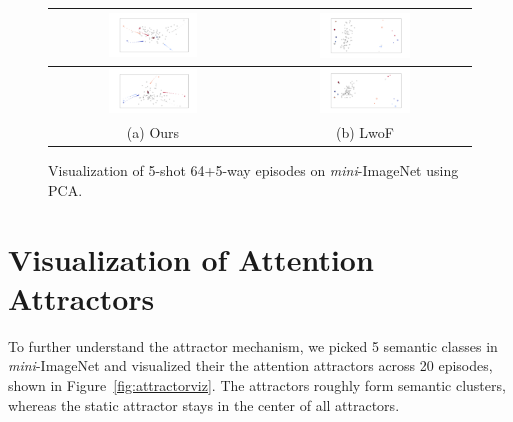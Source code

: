 \begin{figure}[h!]
\begin{minipage}[c]{\textwidth}
\begin{small}
\begin{tabular}{cc}
\hline
\includegraphics[width=0.45\textwidth,trim={2.8cm 1cm 2.5cm 1cm},clip]{figures/attractor_progress_3_noleg.pdf} & 
\includegraphics[width=0.45\textwidth,trim={2.8cm 1cm 2.5cm 1cm},clip]{figures/lwof_progress_3_noleg.pdf}\\
\hline
\includegraphics[width=0.45\textwidth,trim={2.8cm 1cm 2.5cm 1cm},clip]{figures/attractor_progress_8_noleg.pdf} & 
\includegraphics[width=0.45\textwidth,trim={2.8cm 1cm 2.5cm 1cm},clip]{figures/lwof_progress_8_noleg.pdf}\\
(a) Ours & (b) LwoF \citep{lwof}
\end{tabular}
\end{small}
\end{minipage}
\fi
\caption{Visualization of 5-shot 64+5-way episodes on \textit{mini}-ImageNet using PCA.}
\label{fig:moreviz}
\end{figure}

\section{Visualization of Attention Attractors}
To further understand the attractor mechanism, we picked 5 semantic classes in
\textit{mini}-ImageNet and visualized their the attention attractors across 20 episodes, shown in
Figure~\ref{fig:attractorviz}. The attractors roughly form semantic clusters, whereas the static
attractor stays in the center of all attractors.


